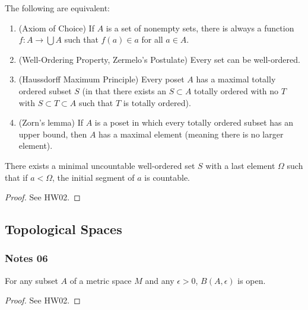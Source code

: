 \documentclass[12pt,letterpaper,reqno]{article}
\begin{document}
\begin{theorem}\label{theorem:choice-equivalents}
    The following are equivalent:
    \begin{enumerate}
        \item (Axiom of Choice) If $A$ is a set of nonempty sets, there is always a function $f: A \to \bigcup A$ such that $f(a) \in a$ for all $a \in A$.
        \item (Well-Ordering Property, Zermelo's Postulate) Every set can be well-ordered.
        \item (Haussdorff Maximum Principle) Every poset $A$ has a maximal totally ordered subset $S$ (in that there exists an $S \subset A$ totally ordered with no $T$ with $S \subset T \subset A$ such that $T$ is totally ordered).
        \item (Zorn's lemma) If $A$ is a poset in which every totally ordered subset has an upper bound, then $A$ has a maximal element (meaning there is no larger element). 
    \end{enumerate}
\end{theorem}

\begin{proposition}\label{proposition:existence-minimal-uncountable-set}
    There exists a minimal uncountable well-ordered set $S$ with a last element $\Omega$ such that if $a < \Omega$, the initial segment of $a$ is countable. 
\end{proposition}

\begin{proof}
    See HW02.
\end{proof}

\newpage
\subsection{Topological Spaces}

\subsubsection{Notes 06}

\begin{proposition}\label{proposition:balls-around-A-open}
    For any subset $A$ of a metric space $M$ and any $\epsilon > 0$, $B(A, \epsilon)$ is open.
\end{proposition}

\begin{proof}
    See HW02.
\end{proof}
\end{document}
